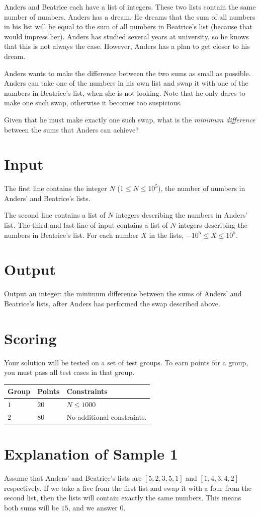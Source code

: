 
Anders and Beatrice each have a list of integers. These two lists contain the same number of numbers. Anders has a dream. He dreams that the sum of all numbers in his list will be equal to the sum of all numbers in Beatrice's list (because that would impress her). Anders has studied several years at university, so he knows that this is not always the case. However, Anders has a plan to get closer to his dream.

Anders wants to make the difference between the two sums as small as possible. Anders can take one of the numbers in his own list and swap it with one of the numbers in Beatrice's list, when she is not looking. Note that he only dares to make one such swap, otherwise it becomes too suspicious.

Given that he must make exactly one such swap, what is the \emph{minimum difference} between the sums that Anders can achieve?

\section*{Input}
The first line contains the integer $N$ ($1 \leq N \leq 10^5$), the number of numbers in Anders' and Beatrice's lists.

The second line contains a list of $N$ integers describing the numbers in Anders' list. The third and last line of input contains a list of $N$ integers describing the numbers in Beatrice's list. For each number $X$ in the lists, $-10^5 \leq X \leq 10^5$.

\section*{Output}
Output an integer: the minimum difference between the sums of Anders' and Beatrice's lists, after Anders has performed the swap described above.

\section*{Scoring}
Your solution will be tested on a set of test groups.
To earn points for a group, you must pass all test cases in that group.

\noindent
\begin{tabular}{| l | l | p{12cm} |}
  \hline
  \textbf{Group} & \textbf{Points} & \textbf{Constraints} \\ \hline
  $1$    & $20$       & $N \leq 1000$ \\ \hline
  $2$    & $80$       & No additional constraints. \\ \hline
\end{tabular}


\section*{Explanation of Sample 1}
Assume that Anders' and Beatrice's lists are $[5,2,3,5,1]$ and $[1,4,3,4,2]$ respectively. If we take a five
from the first list and swap it with a four from the second list, then the lists will contain exactly
the same numbers. This means both sums will be $15$, and we answer $0$.
